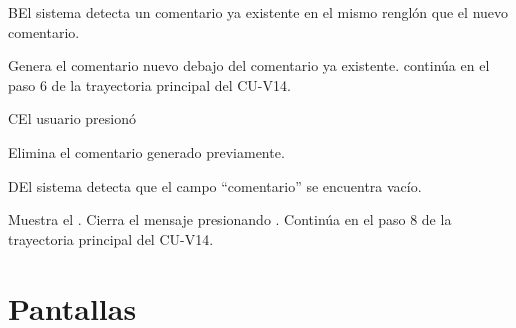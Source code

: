 \label{SP2-CU14-B}
\begin{UCtrayectoriaA}{B}{El sistema detecta un comentario ya existente en el mismo renglón que el nuevo comentario.}

    \UCpaso Genera el comentario nuevo debajo del comentario ya existente. 
    \UCpaso continúa en el paso 6 de la trayectoria principal del CU-V14.
\end{UCtrayectoriaA}

\label{SP2-CU14-C}
\begin{UCtrayectoriaA}{C}{El usuario presionó }

	\UCpaso Elimina el comentario generado previamente.
\end{UCtrayectoriaA}

\label{SP2-CU14-D}
\begin{UCtrayectoriaA}{D}{El sistema detecta que el campo “comentario” se encuentra vacío.} 

	\UCpaso Muestra el .
    \UCpaso[\UCactor] Cierra el mensaje presionando .
    \UCpaso Continúa en el paso 8 de la trayectoria principal del CU-V14.
\end{UCtrayectoriaA}

\chapter{Pantallas}
